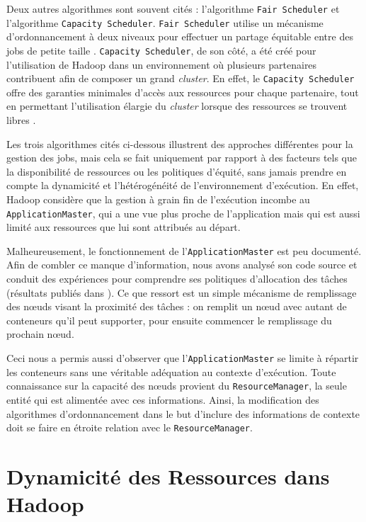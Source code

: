 Deux autres algorithmes sont souvent cités : l'algorithme \texttt{Fair Scheduler} et l'algorithme \texttt{Capacity Scheduler}. \texttt{Fair Scheduler} utilise un mécanisme d'ordonnancement à deux niveaux pour effectuer un partage équitable entre des jobs de petite taille \cite{Hadoop}. \texttt{Capacity Scheduler}, de son côté, a été créé pour l'utilisation de Hadoop dans un environnement où plusieurs partenaires contribuent afin de composer un grand \textit{cluster}. En effet, le \texttt{Capacity Scheduler} offre des garanties minimales d'accès aux ressources pour chaque partenaire, tout en permettant l'utilisation élargie du \textit{cluster} lorsque des ressources se trouvent libres \cite{Hadoop}.

Les trois algorithmes cités ci-dessous illustrent des approches différentes pour la gestion des jobs, mais cela se fait uniquement par rapport à des facteurs tels que la disponibilité de ressources ou les politiques d'équité, sans jamais prendre en compte la dynamicité et l'hétérogénéité de l'environnement d'exécution. En effet, Hadoop considère que la gestion à grain fin de l'exécution incombe au  \texttt{ApplicationMaster}, qui a une vue plus proche de l'application mais qui est aussi limité aux ressources que lui sont attribués au départ.

Malheureusement, le fonctionnement de l'\texttt{ApplicationMaster} est peu documenté. Afin de combler ce manque d'information, nous avons analysé son code source et conduit des expériences pour comprendre ses politiques d'allocation des tâches (résultats publiés dans \cite{UBICOMM2014}). Ce que ressort est un simple mécanisme de remplissage des n{\oe}uds visant la proximité des tâches : on remplit un n{\oe}ud avec autant de conteneurs qu'il peut supporter, pour ensuite commencer le remplissage du prochain n{\oe}ud.   

Ceci nous a permis aussi d'observer que l'\texttt{ApplicationMaster} se limite à répartir les conteneurs sans une véritable adéquation au contexte d'exécution. Toute connaissance sur la capacité des n{\oe}uds provient du \texttt{ResourceManager}, la seule entité qui est alimentée avec ces informations. Ainsi, la modification des algorithmes d'ordonnancement dans le but d'inclure des informations de contexte doit se faire en étroite relation avec le \texttt{ResourceManager}.



\section{Dynamicité des Ressources dans Hadoop} \label{sec:related}

